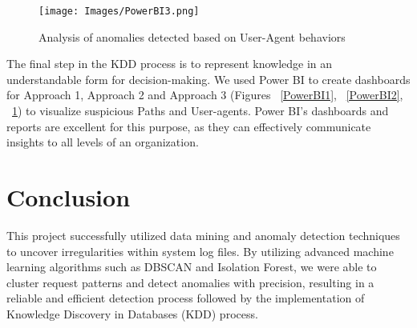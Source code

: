 \begin{figure}
	\begin{center}
		\texttt{[image: Images/PowerBI3.png]}
		\caption{Analysis of anomalies detected based on User-Agent behaviors}
		\label{PowerBI3} 
	\end{center}
\end{figure}

The final step in the KDD process is to represent knowledge in an understandable form for decision-making. We used Power BI to create dashboards for Approach 1, Approach 2 and Approach 3 (Figures ~\ref{PowerBI1}, ~\ref{PowerBI2}, ~\ref{PowerBI3}) to visualize suspicious Paths and User-agents. Power BI's dashboards and reports are excellent for this purpose, as they can effectively communicate insights to all levels of an organization.

\section{Conclusion}
This project successfully utilized data mining and anomaly detection techniques to uncover irregularities within system log files. By utilizing advanced machine learning algorithms such as DBSCAN and Isolation Forest, we were able to cluster request patterns and detect anomalies with precision, resulting in a reliable and efficient detection process followed by the implementation of  Knowledge Discovery in Databases (KDD) process.
